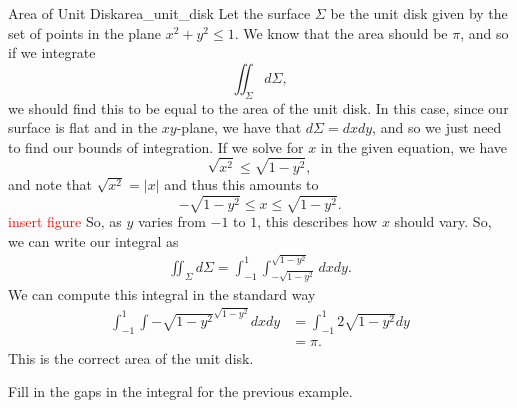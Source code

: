                                       \begin{ex}{Area of Unit Disk}{area_unit_disk}
                                      	Let the surface $\Sigma$ be the unit disk given by the set of points in the plane $x^2+y^2\leq 1$.  We know that the area should be $\pi$, and so if we integrate
                                      	\[
                                      	\iint_\Sigma d\Sigma, 
                                      	\]
                                      	we should find this to be equal to the area of the unit disk.  In this case, since our surface is flat and in the $xy$-plane, we have that $d\Sigma = dxdy$, and so we just need to find our bounds of integration.  If we solve for $x$ in the given equation, we have
                                      	\[
                                      	\sqrt{x^2} \leq \sqrt{1-y^2},
                                      	\]
                                      	and note that $\sqrt{x^2}=|x|$ and thus this amounts to
                                      	\[
                                      	-\sqrt{1-y^2}\leq x \leq \sqrt{1-y^2}.
                                      	\]
                                      	\textcolor{red}{insert figure}
                                      	So, as $y$ varies from $-1$ to $1$, this describes how $x$ should vary. So, we can write our integral as
                                      	\begin{align*}
                                      	\iint_\Sigma d\Sigma = \int_{-1}^1 \int_{-\sqrt{1-y^2}}^{\sqrt{1-y^2}} dxdy.
                                      	\end{align*}
                                      	We can compute this integral in the standard way 
                                      	\begin{align*}
                                      	\int_{-1}^1 \int{-\sqrt{1-y^2}}^{\sqrt{1-y^2}} dxdy &= \int_{-1}^1 2\sqrt{1-y^2}dy\\
                                      	&= \pi.
                                      	\end{align*}
                                      	This is the correct area of the unit disk.
                                      \end{ex}
                                      
                                      \begin{exercise}
                                      Fill in the gaps in the integral for the previous example.
                                      \end{exercise}
                                      

